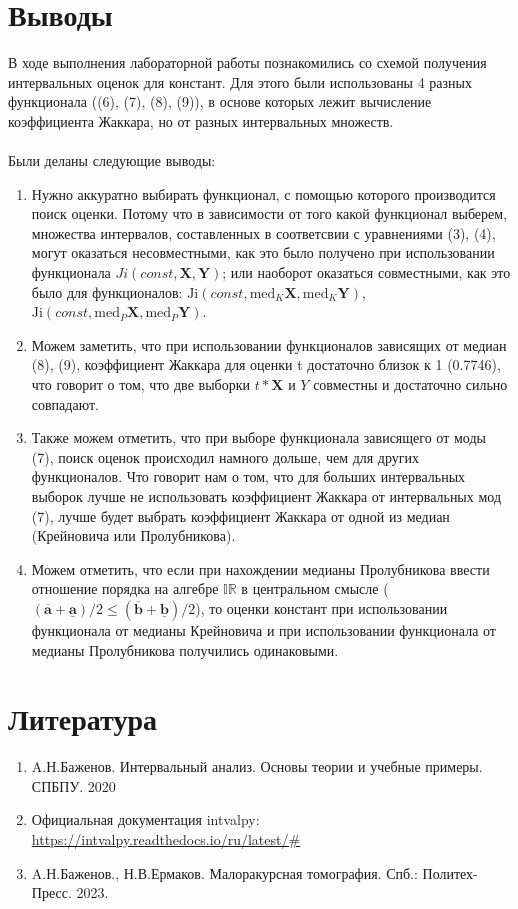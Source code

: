 \documentclass[10pt]{article}
\begin{document}
\section{Выводы}
В ходе выполнения лабораторной работы познакомились со схемой получения интервальных оценок для констант. Для этого были использованы 4 разных функционала ((6), (7), (8), (9)), в основе которых лежит вычисление коэффициента Жаккара, но от разных интервальных множеств.\\
\\
Были деланы следующие выводы:
\begin{enumerate}
    \item Нужно аккуратно выбирать функционал, с помощью которого производится поиск оценки. Потому что в зависимости от того какой функционал выберем, множества интервалов, составленных в соответсвии с уравнениями (3), (4), могут оказаться несовместными, как это было получено при использовании функционала $Ji(const,\mathbf{X},\mathbf{Y})$; или наоборот оказаться совместными, как это было для функционалов: $\text{Ji} (const, \text{med}_K \mathbf{X}, \text{med}_K \mathbf{Y})$, $\text{Ji} (const, \text{med}_P \mathbf{X}, \text{med}_P \mathbf{Y})$.
    \item Можем заметить, что при использовании функционалов зависящих от медиан (8), (9), коэффициент Жаккара для оценки t достаточно близок к 1 (0.7746), что говорит о том, что две выборки $t*\mathbf{X}$ и $Y$ совместны и достаточно сильно совпадают.
    \item Также можем отметить, что при выборе функционала зависящего от моды (7), поиск оценок происходил намного дольше, чем для других функционалов. Что говорит нам о том, что для больших интервальных выборок лучше не использовать коэффициент Жаккара от интервальных мод (7), лучше будет выбрать коэффициент Жаккара от одной из медиан (Крейновича или Пролубникова).
    \item Можем отметить, что если при нахождении медианы Пролубникова ввести отношение порядка на алгебре \( \mathbb{IR} \) в центральном смысле (\( (\overline{\mathbf{a}} + \underline{\mathbf{a}}) / 2 \leq (\overline{\mathbf{b}} + \underline{\mathbf{b}}) / 2 \)), то оценки констант при использовании функционала от медианы Крейновича и при использовании функционала от медианы Пролубникова получились одинаковыми.
    
\end{enumerate}

\section{Литература}
\begin{enumerate}
    \item A.Н.Баженов. Интервальный анализ. Основы теории и учебные примеры. СПБПУ. 2020
    \item Официальная документация intvalpy: \url{https://intvalpy.readthedocs.io/ru/latest/#} 
    \item A.Н.Баженов., Н.В.Ермаков. Малоракурсная томография. Спб.: Политех-Пресс. 2023.  
\end{enumerate}
\end{document}

